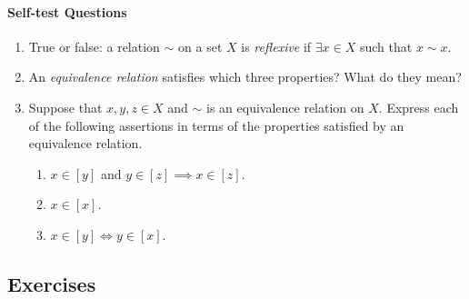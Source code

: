 \paragraph{Self-test Questions}

	\begin{enumerate}
    \item True or false: a relation $\sim$ on a set $X$ is \emph{reflexive} if $\exists x\in X$ such that $x\sim x$.
   	\item An \emph{equivalence relation} satisfies which three properties? What do they mean?
    \item Suppose that $x,y,z\in X$ and $\sim$ is an equivalence relation on $X$. Express each of the following assertions in terms of the properties satisfied by an equivalence relation.
    \begin{enumerate}
      \item $x\in[y]$ and $y\in[z]\implies x\in[z]$.
      \item $x\in[x]$.
      \item $x\in[y]\iff y\in[x]$.
  	\end{enumerate}
  \end{enumerate}

\subsection*{Exercises}

